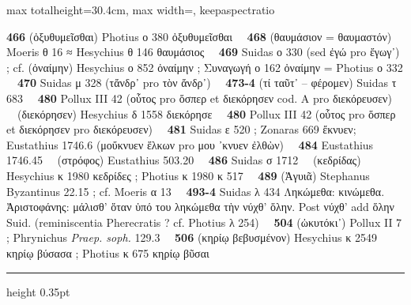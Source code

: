 \documentclass[11pt,twoside]{book}
\newcommand{\Syn}{Συναγωγή }
\newcommand{\Eustathe}{Eustathius }
\newcommand{\Phryn}{Phrynichus \textit{Praep. soph.} }
\newcommand{\espTest}{\ {\color{ruleGold}{\policeFr ∥}}\ }
\begin{document}
\begin{adjustbox}{max totalheight=30.4cm, max width=\textwidth, keepaspectratio}
\begin{minipage}{\textwidth}
{ \textbf{466} (ὀξυθυμεῖσθαι) Photius ο 380 ὀξυθυμεῖσθαι \espTest \textbf{468} (θαυμάσιον = θαυμαστόν) Moeris θ 16 {\policeFr ≈} Hesychius θ 146 θαυμάσιος \espTest \textbf{469} Suidas ο 330 (sed ἐγώ pro ἔγωγ᾽) ; cf. (ὀναίμην) Hesychius ο 852 ὀναίμην ; \Syn ο 162 ὀναίμην = Photius ο 332 \espTest \textbf{470} Suidas μ 328 (τἄνδρ᾽ pro τὸν ἄνδρ᾽) \espTest \textbf{473-4} (τί ταῦτ᾽ -- φέρομεν) Suidas τ 683 \espTest \textbf{480} Pollux III 42 (οὗτος pro ὅσπερ et διεκόρησεν cod. A pro διεκόρευσεν) \espTest (διεκόρησεν) Hesychius δ 1558 διεκόρησε \espTest \textbf{480} Pollux III 42 (οὗτος pro ὅσπερ et διεκόρησεν pro διεκόρευσεν) \espTest \textbf{481} Suidas ε 520 ; Zonaras 669 ἔκνυεν; \Eustathe 1746.6 (μοὔκνυεν ἕλκων pro μου ᾽κνυεν ἐλθὼν) \espTest \textbf{484} \Eustathe 1746.45 \espTest (στρόφος) \Eustathe 503.20 \espTest \textbf{486} Suidas σ 1712 \espTest (κεδρίδας) Hesychius κ 1980 κεδρίδες ; Photius κ 1980 κ 517 \espTest \textbf{489} (Ἀγυιᾶ) Stephanus Byzantinus 22.15 ; cf. Moeris α 13 \espTest \textbf{493-4} Suidas λ 434 Ληκώμεθα: κινώμεθα. Ἀριστοφάνης: μάλισθ' ὅταν ὑπό του ληκώμεθα τὴν νύχθ' ὅλην. Post νύχθ' add ὅλην Suid. (reminiscentia Pherecratis ? cf. Photius λ 254) \espTest \textbf{504} (ὠκυτόκι᾽) Pollux II 7 ; \Phryn 129.3 \espTest \textbf{506} (κηρίῳ βεβυσμένον) Hesychius κ 2549 κηρίῳ βύσασα ; Photius κ 675 κηρίῳ βῦσαι\par\vspace{2.5pt}
{\color{ruleGold}\hrule height 0.35pt}\vspace{2.5pt}
}
\end{minipage}
\end{adjustbox}
\end{document}
